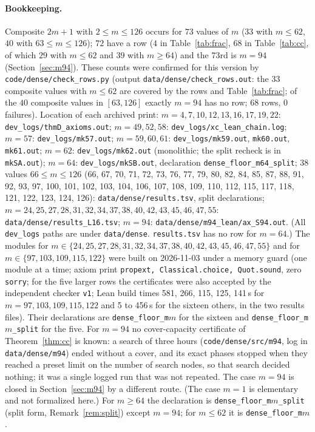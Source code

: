 \documentclass[11pt]{article}
\theoremstyle{remark}
\begin{document}
\paragraph{Bookkeeping.} Composite $2m+1$ with $2\le m\le126$ occurs for $73$ values of $m$ ($33$ with $m\le62$, $40$ with $63\le m\le126$); $72$ have a row ($4$ in Table~\ref{tab:frac}, $68$ in Table~\ref{tab:cc}, of which $29$ with $m\le62$ and $39$ with $m\ge64$) and the $73$rd is $m=94$ (Section~\ref{sec:m94}). These counts were confirmed for this version by \texttt{code/dense/check\_rows.py} (output \texttt{data/dense/check\_rows.out}: the $33$ composite values with $m\le62$ are covered by the rows and Table~\ref{tab:frac}; of the $40$ composite values in $[63,126]$ exactly $m=94$ has no row; $68$ rows, $0$ failures). Location of each archived print: $m=4,7,10,12,13,16,17,19,22$: \texttt{dev\_logs\slash thmD\_axioms.out}; $m=49,52,58$: \texttt{dev\_logs\slash xc\_lean\_chain.log}; $m=57$: \texttt{dev\_logs\slash mk57.out}; $m=59,60,61$: \texttt{dev\_logs\slash mk59.out}, \texttt{mk60.out}, \texttt{mk61.out}; $m=62$: \texttt{dev\_logs\slash mk62.out} (monolithic; the split recheck is in \texttt{mkSA.out}); $m=64$: \texttt{dev\_logs\slash mkSB.out}, declaration \texttt{dense\_floor\_m64\_split}; $38$ values $66\le m\le126$ (66, 67, 70, 71, 72, 73, 76, 77, 79, 80, 82, 84, 85, 87, 88, 91, 92, 93, 97, 100, 101, 102, 103, 104, 106, 107, 108, 109, 110, 112, 115, 117, 118, 121, 122, 123, 124, 126): \texttt{data\slash dense\slash results.tsv}, split declarations; $m=24,25,27,28,31,32,34,37,38,40,42,43,45,46,47,55$: \texttt{data\slash dense\slash results\_L16.tsv}; $m=94$: \texttt{data\slash dense\slash m94\_lean\slash ax\_S94.out}. (All \texttt{dev\_logs} paths are under \texttt{data\slash dense}. \texttt{results.tsv} has no row for $m=64$.) The modules for $m\in\{24,25,27,28,31,32,34,37,38,40,42,43,45,46,47,55\}$ and for $m\in\{97,103,109,115,122\}$ were built on 2026-11-03 under a memory guard (one module at a time; axiom print \texttt{propext, Classical.choice, Quot.sound}, zero \texttt{sorry}; for the five larger rows the certificates were also accepted by the independent checker \texttt{v1}; Lean build times 581, 266, 115, 125, 141\,s for $m=97,103,109,115,122$ and 5 to 456\,s for the sixteen others, in the two results files). Their declarations are \texttt{dense\_floor\_m$m$} for the sixteen and \texttt{dense\_floor\_m$m$\_split} for the five. For $m=94$ no cover-capacity certificate of Theorem~\ref{thm:cc} is known: a search of three hours (\texttt{code\slash dense\slash src\slash m94}, log in \texttt{data\slash dense\slash m94}) ended without a cover, and its exact phases stopped when they reached a preset limit on the number of search nodes, so that search decided nothing; it was a single logged run that was not repeated. The case $m=94$ is closed in Section~\ref{sec:m94} by a different route. (The case $m=1$ is elementary and not formalized here.) For $m\ge64$ the declaration is \texttt{dense\_floor\_m$m$\_split} (split form, Remark~\ref{rem:split}) except $m=94$; for $m\le62$ it is \texttt{dense\_floor\_m$m$}.
\end{document}
